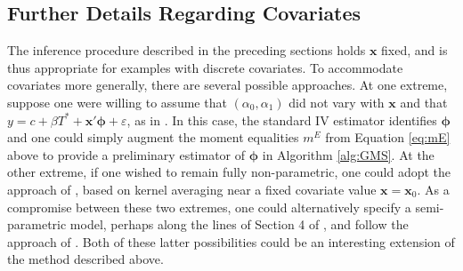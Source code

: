 \subsection{Further Details Regarding Covariates}
\label{sec:covariates}

The inference procedure described in the preceding sections holds $\mathbf{x}$ fixed, and is thus appropriate for examples with discrete covariates.
To accommodate covariates more generally, there are several possible approaches.
At one extreme, suppose one were willing to assume that $(\alpha_0, \alpha_1)$ did not vary with $\mathbf{x}$ and that $y = c + \beta T^* + \mathbf{x}'\boldsymbol{\phi} + \varepsilon$, as in \cite{FL}.
In this case, the standard IV estimator identifies $\boldsymbol{\phi}$ and one could simply augment the moment equalities $m^E$ from Equation \ref{eq:mE} above to provide a preliminary estimator of $\boldsymbol{\phi}$ in Algorithm \ref{alg:GMS}.
At the other extreme, if one wished to remain fully non-parametric, one could adopt the approach of \cite{andrews2014nonparametric}, based on kernel averaging near a fixed covariate value $\mathbf{x} = \mathbf{x}_0$.
As a compromise between these two extremes, one could alternatively specify a semi-parametric model, perhaps along the lines of Section 4 of \cite{Lewbel}, and follow the approach of \cite{andrews2013inference}.
Both of these latter possibilities could be an interesting extension of the method described above.
